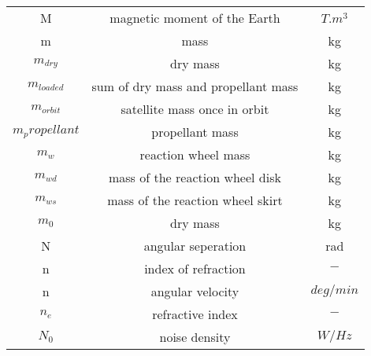 \begin{center}
\begin{longtable}{c|c|c}
M                                   & magnetic moment of the Earth                 														& $T.m^3$ \\

m 																	& mass 																																		& kg \\

$m_{dry}$                           & dry mass                                    														& kg \\

$m_{loaded}$												& sum of dry mass and propellant mass																			& kg \\

$m_{orbit}$                         & satellite mass once in orbit                														& kg \\

$m_propellant$ 											& propellant mass 																												& kg \\

$m_w$                               & reaction wheel mass  																										& kg \\

$m_{wd}$                            & mass of the reaction wheel disk  																				& kg \\

$m_{ws}$                            & mass of the reaction wheel skirt 																				& kg \\

$m_0$                               & dry mass                         																				& kg \\

N 																	& angular seperation 																											& rad \\

n 																	& index of refraction																											& $-$ \\

n                                		& angular velocity                             														& $deg/{min}$ \\

$n_e$ 															& refractive index 																												& $-$ \\

$N_0$                           		& noise density                                														& $W/Hz$ \\


\end{longtable}
\end{center}
